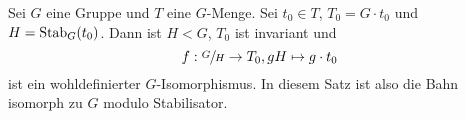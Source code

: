 \begin{theorem}
	Sei $G$ eine Gruppe und $T$ eine $G$-Menge.
	Sei $t_0 \in T$, $T_0 = G \cdot t_0$ und $H = \operatorname{Stab}_{G}(t_0)$.
	Dann ist $H < G$, $T_0$ ist invariant und 
	\[
		f: \sfrac{G}{H} \to T_0, gH \mapsto g\cdot t_0
	\]
	ist ein wohldefinierter $G$-Isomorphismus.
	In diesem Satz ist also die Bahn isomorph zu $G$ modulo Stabilisator.
\end{theorem}






































